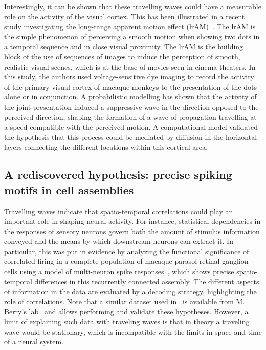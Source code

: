 \documentclass[brainsci, %
               review,submit,pdftex,moreauthors
               ]{Definitions/mdpi}
\begin{document}
Interestingly, it can be shown that these travelling waves could have a measurable role on the activity of the visual cortex. This has been illustrated in a recent study investigating the long-range apparent motion effect (lrAM)~\citep{chemla_suppressive_2019}. The lrAM is the simple phenomenon of perceiving a smooth motion when showing two dots in a temporal sequence and in close visual proximity. The lrAM is the building block of the use of sequences of images to induce the perception of smooth, realistic visual scenes, which is at the base of movies seen in cinema theaters. In this study, the authors used voltage-sensitive dye imaging to record the activity of the primary visual cortex of macaque monkeys to the presentation of the dots alone or in conjunction. A probabilistic modelling has shown that the activity of the joint presentation induced a suppressive wave in the direction opposed to the perceived direction, shaping the formation of a wave of propagation travelling at a speed compatible with the perceived motion. A computational model validated the hypothesis that this process could be mediated by diffusion in the horizontal layers connecting the different locations within this cortical area.
%
%
\subsection{A rediscovered  hypothesis: precise spiking motifs in cell assemblies}
Travelling waves indicate that spatio-temporal correlations could play an important role in shaping neural activity. For instance, statistical dependencies in the responses of sensory neurons govern both the amount of stimulus information conveyed and the means by which downstream neurons can extract it. In particular, this was put in evidence by analyzing the functional significance of correlated firing in a complete population of macaque parasol retinal ganglion cells using a model of multi-neuron spike responses~\citep{pillow_spatio-temporal_2008}, which shows precise spatio-temporal differences in this recurrently connected assembly. The different aspects of information in the data are evaluated by a decoding strategy, highlighting the role of correlations. Note that a similar dataset used in~\citep{schneidman_weak_2006} is available from M. Berry's lab~\citep{berry_spike_2022} and allows performing and validate these hypotheses. However, a limit of explaining such data with traveling waves is that in theory a traveling wave would be stationary, which is incompatible with the limits in space and time of a neural system. 
\end{document}
